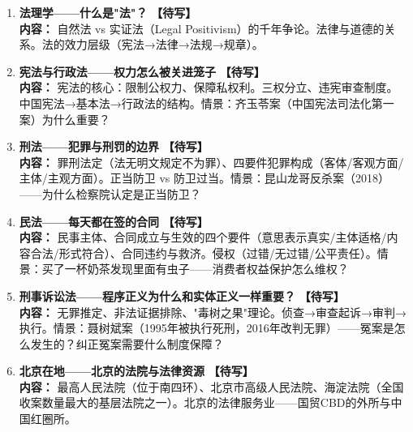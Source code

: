 \documentclass[a4paper,11pt]{ctexart}
\newcommand{\draft}{\textcolor{orange!80!black}{\textbf{【待写】}}}
\begin{document}
\begin{enumerate}
\item[\textbf{第1课}] \textbf{法理学——什么是"法"？} \draft \\
\textbf{内容：} 自然法 vs 实证法（Legal Positivism）的千年争论。法律与道德的关系。法的效力层级（宪法→法律→法规→规章）。
\item[\textbf{第2课}] \textbf{宪法与行政法——权力怎么被关进笼子} \draft \\
\textbf{内容：} 宪法的核心：限制公权力、保障私权利。三权分立、违宪审查制度。中国宪法→基本法→行政法的结构。情景：齐玉苓案（中国宪法司法化第一案）为什么重要？
\item[\textbf{第3课}] \textbf{刑法——犯罪与刑罚的边界} \draft \\
\textbf{内容：} 罪刑法定（法无明文规定不为罪）、四要件犯罪构成（客体/客观方面/主体/主观方面）。正当防卫 vs 防卫过当。情景：昆山龙哥反杀案（2018）——为什么检察院认定是正当防卫？
\item[\textbf{第4课}] \textbf{民法——每天都在签的合同} \draft \\
\textbf{内容：} 民事主体、合同成立与生效的四个要件（意思表示真实/主体适格/内容合法/形式符合）、合同违约与救济。侵权（过错/无过错/公平责任）。情景：买了一杯奶茶发现里面有虫子——消费者权益保护怎么维权？
\item[\textbf{第5课}] \textbf{刑事诉讼法——程序正义为什么和实体正义一样重要？} \draft \\
\textbf{内容：} 无罪推定、非法证据排除、"毒树之果"理论。侦查→审查起诉→审判→执行。情景：聂树斌案（1995年被执行死刑，2016年改判无罪）——冤案是怎么发生的？纠正冤案需要什么制度保障？
\item[\textbf{第6课}] \textbf{北京在地——北京的法院与法律资源} \draft \\
\textbf{内容：} 最高人民法院（位于南四环）、北京市高级人民法院、海淀法院（全国收案数量最大的基层法院之一）。北京的法律服务业——国贸CBD的外所与中国红圈所。
\end{enumerate}
\end{document}
